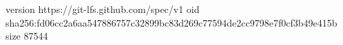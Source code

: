 version https://git-lfs.github.com/spec/v1
oid sha256:fd06cc2a6aa547886757c32899bc83d269c77594de2cc9798e7f0cf3b49e415b
size 87544
